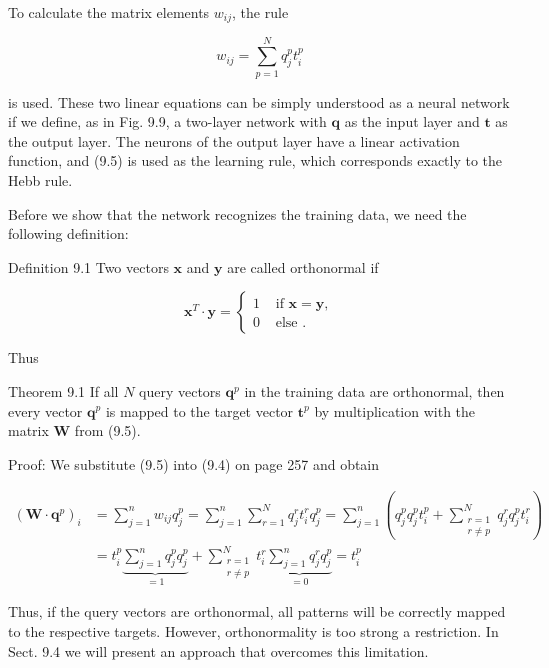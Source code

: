\documentclass[10pt]{book}
\begin{document}
To calculate the matrix elements $w_{i j}$, the rule


\begin{equation*}
w_{i j}=\sum_{p=1}^{N} q_{j}^{p} t_{i}^{p} \tag{9.5}
\end{equation*}


is used. These two linear equations can be simply understood as a neural network if we define, as in Fig. 9.9, a two-layer network with $\boldsymbol{q}$ as the input layer and $\boldsymbol{t}$ as the output layer. The neurons of the output layer have a linear activation function, and (9.5) is used as the learning rule, which corresponds exactly to the Hebb rule.

Before we show that the network recognizes the training data, we need the following definition:

Definition 9.1 Two vectors $\boldsymbol{x}$ and $\boldsymbol{y}$ are called orthonormal if

$$
\boldsymbol{x}^{T} \cdot \boldsymbol{y}= \begin{cases}1 & \text { if } \boldsymbol{x}=\boldsymbol{y}, \\ 0 & \text { else } .\end{cases}
$$

Thus

Theorem 9.1 If all $N$ query vectors $\boldsymbol{q}^{p}$ in the training data are orthonormal, then every vector $\boldsymbol{q}^{p}$ is mapped to the target vector $\boldsymbol{t}^{p}$ by multiplication with the matrix $\boldsymbol{W}$ from (9.5).

Proof: We substitute (9.5) into (9.4) on page 257 and obtain

$$
\begin{aligned}
\left(\boldsymbol{W} \cdot \boldsymbol{q}^{p}\right)_{i} & =\sum_{j=1}^{n} w_{i j} q_{j}^{p}=\sum_{j=1}^{n} \sum_{r=1}^{N} q_{j}^{r} t_{i}^{r} q_{j}^{p}=\sum_{j=1}^{n}\left(q_{j}^{p} q_{j}^{p} t_{i}^{p}+\sum_{\substack{r=1 \\
r \neq p}}^{N} q_{j}^{r} q_{j}^{p} t_{i}^{r}\right) \\
& =t_{i}^{p} \underbrace{\sum_{j=1}^{n} q_{j}^{p} q_{j}^{p}}_{=1}+\sum_{\substack{r=1 \\
r \neq p}}^{N} t_{i}^{r} \underbrace{\sum_{j=1}^{n} q_{j}^{r} q_{j}^{p}}_{=0}=t_{i}^{p}
\end{aligned}
$$

Thus, if the query vectors are orthonormal, all patterns will be correctly mapped to the respective targets. However, orthonormality is too strong a restriction. In Sect. 9.4 we will present an approach that overcomes this limitation.
\end{document}
